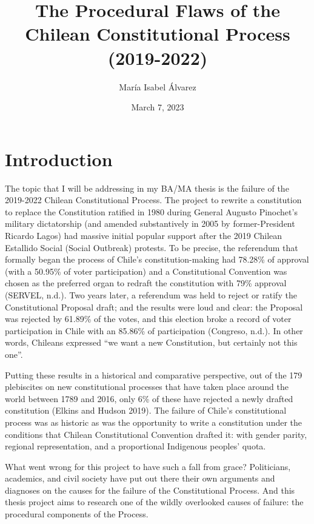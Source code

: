 \documentclass[
]{article}
\title{The Procedural Flaws of the Chilean Constitutional Process
(2019-2022)}
\author{María Isabel Álvarez}
\date{March 7, 2023}
\begin{document}
\maketitle

\hypertarget{introduction}{%
\section{Introduction}\label{introduction}}

The topic that I will be addressing in my BA/MA thesis is the failure of
the 2019-2022 Chilean Constitutional Process. The project to rewrite a
constitution to replace the Constitution ratified in 1980 during General
Augusto Pinochet's military dictatorship (and amended substantively in
2005 by former-President Ricardo Lagos) had massive initial popular
support after the 2019 Chilean Estallido Social (Social Outbreak)
protests. To be precise, the referendum that formally began the process
of Chile's constitution-making had 78.28\% of approval (with a 50.95\%
of voter participation) and a Constitutional Convention was chosen as
the preferred organ to redraft the constitution with 79\% approval
(SERVEL, n.d.). Two years later, a referendum was held to reject or
ratify the Constitutional Proposal draft; and the results were loud and
clear: the Proposal was rejected by 61.89\% of the votes, and this
election broke a record of voter participation in Chile with an 85.86\%
of participation (Congreso, n.d.). In other words, Chileans expressed
``we want a new Constitution, but certainly not this one''.

Putting these results in a historical and comparative perspective, out
of the 179 plebiscites on new constitutional processes that have taken
place around the world between 1789 and 2016, only 6\% of these have
rejected a newly drafted constitution (Elkins and Hudson 2019). The
failure of Chile's constitutional process was as historic as was the
opportunity to write a constitution under the conditions that Chilean
Constitutional Convention drafted it: with gender parity, regional
representation, and a proportional Indigenous peoples' quota.

What went wrong for this project to have such a fall from grace?
Politicians, academics, and civil society have put out there their own
arguments and diagnoses on the causes for the failure of the
Constitutional Process. And this thesis project aims to research one of
the wildly overlooked causes of failure: the procedural components of
the Process.
\end{document}

